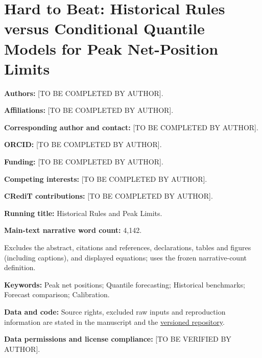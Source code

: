 \documentclass[12pt,a4paper]{article}
\begin{document}
\pagestyle{empty}
\section*{Hard to Beat: Historical Rules versus Conditional Quantile Models for Peak Net-Position Limits}
\noindent\textbf{Authors:} [TO BE COMPLETED BY AUTHOR].\par\medskip
\noindent\textbf{Affiliations:} [TO BE COMPLETED BY AUTHOR].\par\medskip
\noindent\textbf{Corresponding author and contact:} [TO BE COMPLETED BY AUTHOR].\par\medskip
\noindent\textbf{ORCID:} [TO BE COMPLETED BY AUTHOR].\par\medskip
\noindent\textbf{Funding:} [TO BE COMPLETED BY AUTHOR].\par\medskip
\noindent\textbf{Competing interests:} [TO BE COMPLETED BY AUTHOR].\par\medskip
\noindent\textbf{CRediT contributions:} [TO BE COMPLETED BY AUTHOR].\par\medskip
\noindent\textbf{Running title:} Historical Rules and Peak Limits.\par\medskip
\noindent\textbf{Main-text narrative word count:} 4,142.\par
Excludes the abstract, citations and references, declarations, tables and figures (including captions), and displayed equations; uses the frozen narrative-count definition.\par\medskip
\noindent\textbf{Keywords:} Peak net positions; Quantile forecasting; Historical benchmarks; Forecast comparison; Calibration.\par\medskip
\noindent\textbf{Data and code:} Source rights, excluded raw inputs and reproduction information are stated in the manuscript and the \href{https://github.com/ByronLi0207/financial-mathematics-paper-20261020/tree/submission-final}{versioned repository}.\par\medskip
\noindent\textbf{Data permissions and license compliance:} [TO BE VERIFIED BY AUTHOR].
\end{document}
